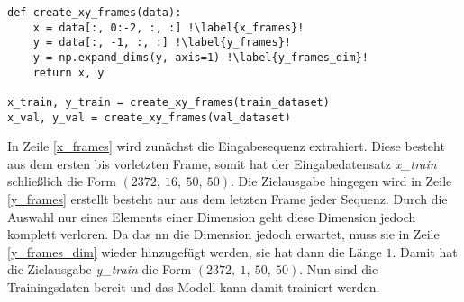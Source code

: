 \begin{code}
\begin{verbatim}
def create_xy_frames(data):
    x = data[:, 0:-2, :, :] !\label{x_frames}!
    y = data[:, -1, :, :] !\label{y_frames}!
    y = np.expand_dims(y, axis=1) !\label{y_frames_dim}!
    return x, y

x_train, y_train = create_xy_frames(train_dataset)
x_val, y_val = create_xy_frames(val_dataset)
\end{verbatim}
\label{lst:CreateXYFrames}
\end{code}

In Zeile \ref{x_frames} wird zunächst die Eingabesequenz extrahiert.
Diese besteht aus dem ersten bis vorletzten Frame, somit hat der Eingabedatensatz \emph{x\_train} schließlich die Form $(2372,~16,~50,~50)$.
Die Zielausgabe hingegen wird in Zeile \ref{y_frames} erstellt besteht nur aus dem letzten Frame jeder Sequenz.
Durch die Auswahl nur eines Elements einer Dimension geht diese Dimension jedoch komplett verloren.
Da das \acrshort{nn} die Dimension jedoch erwartet, muss sie in Zeile \ref{y_frames_dim} wieder hinzugefügt werden, sie hat dann die Länge $1$.
Damit hat die Zielausgabe \emph{y\_train} die Form $(2372,~1,~50,~50)$.
Nun sind die Trainingsdaten bereit und das Modell kann damit trainiert werden.
